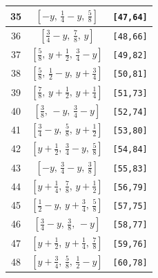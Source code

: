 \documentclass[fleqn,8pt]{jsarticle}
\begin{document}
\begin{longtable}{ccc}
35 & $\left[ - y,\, \frac{1}{4} - y,\, \frac{5}{8} \right]$ & {\tt [47,64]} \\ \hline
36 & $\left[ \frac{3}{4} - y,\, \frac{7}{8},\, y \right]$ & {\tt [48,66]} \\ \hline
37 & $\left[ \frac{5}{8},\, y + \frac{1}{2},\, \frac{3}{4} - y \right]$ & {\tt [49,82]} \\ \hline
38 & $\left[ \frac{5}{8},\, \frac{1}{2} - y,\, y + \frac{3}{4} \right]$ & {\tt [50,81]} \\ \hline
39 & $\left[ \frac{7}{8},\, y + \frac{1}{2},\, y + \frac{1}{4} \right]$ & {\tt [51,73]} \\ \hline
40 & $\left[ \frac{3}{8},\, - y,\, \frac{3}{4} - y \right]$ & {\tt [52,74]} \\ \hline
41 & $\left[ \frac{3}{4} - y,\, \frac{5}{8},\, y + \frac{1}{2} \right]$ & {\tt [53,80]} \\ \hline
42 & $\left[ y + \frac{1}{2},\, \frac{3}{4} - y,\, \frac{5}{8} \right]$ & {\tt [54,84]} \\ \hline
43 & $\left[ - y,\, \frac{3}{4} - y,\, \frac{3}{8} \right]$ & {\tt [55,83]} \\ \hline
44 & $\left[ y + \frac{1}{4},\, \frac{7}{8},\, y + \frac{1}{2} \right]$ & {\tt [56,79]} \\ \hline
45 & $\left[ \frac{1}{2} - y,\, y + \frac{3}{4},\, \frac{5}{8} \right]$ & {\tt [57,75]} \\ \hline
46 & $\left[ \frac{3}{4} - y,\, \frac{3}{8},\, - y \right]$ & {\tt [58,77]} \\ \hline
47 & $\left[ y + \frac{1}{2},\, y + \frac{1}{4},\, \frac{7}{8} \right]$ & {\tt [59,76]} \\ \hline
48 & $\left[ y + \frac{3}{4},\, \frac{5}{8},\, \frac{1}{2} - y \right]$ & {\tt [60,78]} \\
\end{longtable}
\renewcommand{\arraystretch}{1.2}
\end{document}
